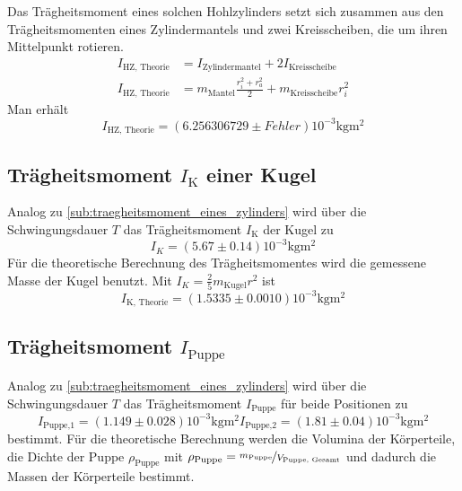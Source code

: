 Das Trägheitsmoment eines solchen Hohlzylinders setzt sich zusammen aus den Trägheitsmomenten eines Zylindermantels und zwei Kreisscheiben, die um ihren Mittelpunkt rotieren.
\begin{align*}
	I_{\text{HZ, Theorie}}&=I_{\text{Zylindermantel}}+2I_{\text{Kreisscheibe}}\\
	I_{\text{HZ, Theorie}}&=m_\text{Mantel} \frac{r_i^2+r_a^2}{2}+m_\text{Kreisscheibe} r_i^2
\end{align*}
Man erhält
\begin{equation}
	I_{\text{HZ, Theorie}}= (6.256306729\pm Fehler)10^{-3} \si{\kilo\gram\meter\squared}
\end{equation}


\subsection{Trägheitsmoment $I_\text{K}$ einer Kugel}

Analog zu \ref{sub:traegheitsmoment_eines_zylinders} wird über die Schwingungsdauer $T$ das Trägheitsmoment $I_\text{K}$ der Kugel zu
\begin{equation}
	\label{wert:Kugel}
	I_K=(5.67\pm0.14)10^{-3} \si{\kilo\gram\meter\squared}
\end{equation}
Für die theoretische Berechnung des Trägheitsmomentes wird die gemessene Masse der Kugel benutzt.
Mit $I_K = \frac{2}{5} m_{\text{Kugel}} r^2$ ist 
\begin{equation}
	\label{wert:Kugel}
	I_\text{K, Theorie}= (1.5335\pm0.0010)10^{-3} \si{\kilo\gram\meter\squared}
\end{equation}
\newpage

\subsection{Trägheitsmoment $I_\text{Puppe}$}

Analog zu \ref{sub:traegheitsmoment_eines_zylinders} wird über die Schwingungsdauer $T$ das Trägheitsmoment $I_\text{Puppe}$ für beide Positionen zu
\begin{subequations}
	\begin{equation}
		\label{wert:Puppe1}
		I_\text{Puppe,1}=(1.149\pm0.028)10^{-3} \si{\kilo\gram\meter\squared}
	\end{equation}
	\begin{equation}
		\label{wert:Puppe2}
		I_\text{Puppe,2}=(1.81\pm0.04)10^{-3} \si{\kilo\gram\meter\squared}
	\end{equation}
\end{subequations}
bestimmt. 
Für die theoretische Berechnung werden die Volumina der Körperteile, die Dichte der Puppe $\rho_\text{Puppe}$ 
mit $\rho_\text{Puppe}=\nicefrac{m_\text{Puppe}}{V_\text{Puppe, Gesamt}}$ und dadurch die Massen der Körperteile bestimmt.
\begin{landscape}
	\centering
	
	
\end{landscape}
